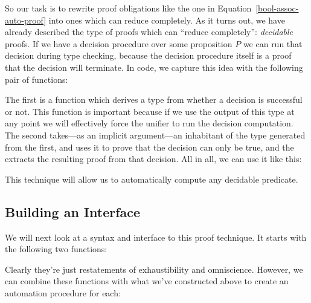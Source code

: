 So our task is to rewrite proof obligations like the one in
Equation~\ref{bool-assoc-auto-proof} into ones which can reduce completely. 
As it turns out, we have already described the type of proofs which can ``reduce
completely'': \emph{decidable} proofs.
If we have a decision procedure over some proposition \(P\) we can run that
decision during type checking, because the decision procedure itself is a proof
that the decision will terminate.
In code, we capture this idea with the following pair of functions:
\begin{multicols}{2}
  \begin{agdalisting*}
  \end{agdalisting*} \columnbreak
  \begin{agdalisting*}
  \end{agdalisting*}
\end{multicols}
The first is a function which derives a type from whether a decision is
successful or not.
This function is important because if we use the output of this type at any
point we will effectively force the unifier to run the decision computation.
The second takes---as an implicit argument---an inhabitant of the type generated
from the first, and uses it to prove that the decision can only be true, and the
extracts the resulting proof from that decision.
All in all, we can use it like this:
\begin{agdalisting*}
\end{agdalisting*}
This technique will allow us to automatically compute any decidable predicate.
\subsection{Building an Interface}
We will next look at a syntax and interface to this proof technique.
It starts with the following two functions:

\begin{minipage}{\linewidth}
  \begin{multicols}{2}
    \begin{agdalisting*}
    \end{agdalisting*} \columnbreak
    \begin{agdalisting*}
    \end{agdalisting*}
  \end{multicols}
\end{minipage}
Clearly they're just restatements of exhaustibility and omniscience.
However, we can combine these functions with what we've constructed above to
create an automation procedure for each:

